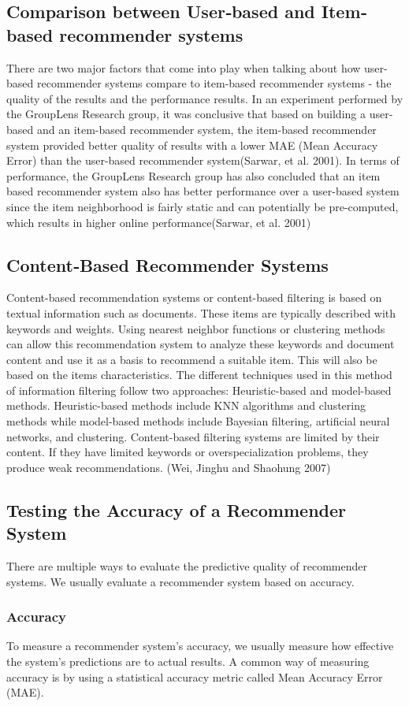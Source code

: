 \subsection{Comparison between User‐based and Item‐based recommender systems}
There are two major factors that come into play when talking about how user-based recommender systems compare to item-based recommender systems - the quality of the results and the performance results. 
In an experiment performed by the GroupLens Research group, it was conclusive that based on building a user-based and an item-based recommender system, the item-based recommender system provided better quality of results with a lower MAE (Mean Accuracy Error) than the user-based recommender system(Sarwar, et al. 2001). 
In terms of performance, the GroupLens Research group has also concluded that an  item based recommender system also has better performance over a user-based system since the item neighborhood is fairly static and can potentially be pre-computed, which results in higher online performance(Sarwar, et al. 2001)
\subsection{Content‐Based Recommender Systems}
Content-based recommendation systems or content-based filtering is based on textual information such as documents. These items are typically described with keywords and weights. Using nearest neighbor functions or clustering methods can allow this recommendation system to analyze these keywords and document content and use it as a basis to recommend a suitable item. This will also be based on the items characteristics. The different techniques used in this method of information filtering follow two approaches: Heuristic-based and model-based methods. Heuristic-based methods include KNN algorithms and clustering methods while model-based methods include Bayesian filtering, artificial neural networks, and clustering. Content-based filtering systems are limited by their content. If they have limited keywords or overspecialization problems, they produce weak recommendations. (Wei, Jinghu and Shaohung 2007)
\subsection{Testing the Accuracy of a Recommender System}
There are multiple ways to evaluate the predictive quality of recommender systems. We usually evaluate a recommender system based on accuracy.
\subsubsection{Accuracy}
To measure a recommender system’s accuracy, we usually measure how effective the system’s predictions are to actual results. A common way of measuring accuracy is by using a statistical accuracy metric called Mean Accuracy Error (MAE).
